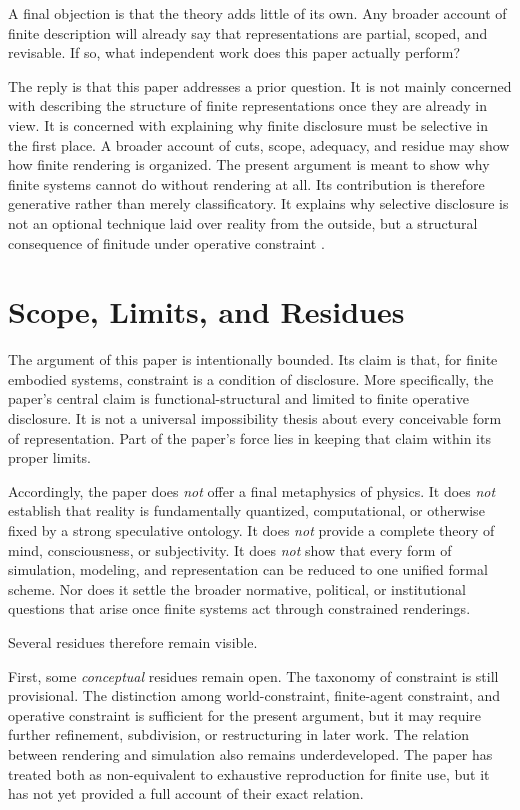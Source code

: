 \documentclass[11pt]{article}
\renewcommand{\emph}[1]{\textit{#1}}
\begin{document}
A final objection is that the theory adds little of its own. Any broader account of finite description will already say that representations are partial, scoped, and revisable. If so, what independent work does this paper actually perform?

The reply is that this paper addresses a prior question. It is not mainly concerned with describing the structure of finite representations once they are already in view. It is concerned with explaining why finite disclosure must be selective in the first place. A broader account of cuts, scope, adequacy, and residue may show how finite rendering is organized. The present argument is meant to show why finite systems cannot do without rendering at all. Its contribution is therefore generative rather than merely classificatory. It explains why selective disclosure is not an optional technique laid over reality from the outside, but a structural consequence of finitude under operative constraint \cite{Wheeler2024BoundedRationalitySEP,ConantAshby1970GoodRegulator,FriggNguyen2021ScientificRepresentationSEP}.
\section{Scope, Limits, and Residues}

The argument of this paper is intentionally bounded. Its claim is that, for finite embodied systems, constraint is a condition of disclosure. More specifically, the paper's central claim is functional-structural and limited to finite operative disclosure. It is not a universal impossibility thesis about every conceivable form of representation. Part of the paper's force lies in keeping that claim within its proper limits.

Accordingly, the paper does \emph{not} offer a final metaphysics of physics. It does \emph{not} establish that reality is fundamentally quantized, computational, or otherwise fixed by a strong speculative ontology. It does \emph{not} provide a complete theory of mind, consciousness, or subjectivity. It does \emph{not} show that every form of simulation, modeling, and representation can be reduced to one unified formal scheme. Nor does it settle the broader normative, political, or institutional questions that arise once finite systems act through constrained renderings.

Several residues therefore remain visible.

First, some \emph{conceptual} residues remain open. The taxonomy of constraint is still provisional. The distinction among world-constraint, finite-agent constraint, and operative constraint is sufficient for the present argument, but it may require further refinement, subdivision, or restructuring in later work. The relation between rendering and simulation also remains underdeveloped. The paper has treated both as non-equivalent to exhaustive reproduction for finite use, but it has not yet provided a full account of their exact relation.
\end{document}
